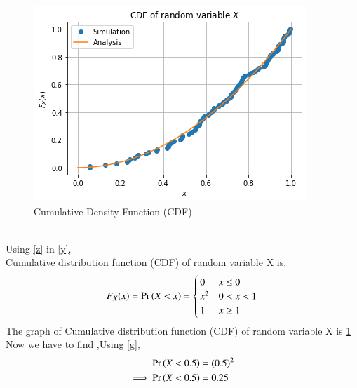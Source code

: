 \documentclass[journal,12pt,twocolumn]{IEEEtran}
\begin{document}
\begin{figure}[ht]
    \centering
    \includegraphics[width=\columnwidth]{assign2_1.png}
    \caption{Cumulative Density Function (CDF)}
    \label{Figure_3}
\end{figure}
\\Using \eqref{z} in \eqref{y},
\\Cumulative distribution function (CDF) of random variable X is,
\begin{align}
F_X(x)= \Pr\left(X<x\right)
= 
\begin{cases}
0 & x\leq0\\
x^2 & 0<x<1
\\
1 & x\geq1\label{g}\\
\end{cases}
\end{align}
The graph of Cumulative distribution function (CDF) of random variable X is \ref{Figure_3}\\
Now we have to find ,Using  \eqref{g},
\begin{align}
    \Pr\left(X<0.5\right) &= (0.5)^2\\
  \implies \Pr\left(X<0.5\right) &= 0.25
\end{align}
\end{document}
